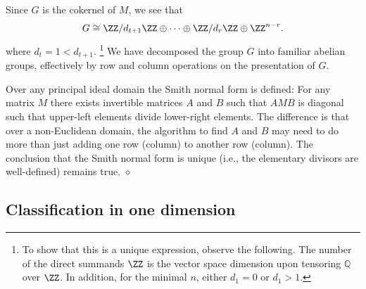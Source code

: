 Since $G$ is the cokernel of $M$,
we see that
\begin{align}
 G \cong \ZZ/d_{t+1} \ZZ \oplus \cdots \oplus \ZZ / d_r\ZZ \oplus \ZZ^{n-r} .
\end{align}
where $d_t = 1 < d_{t+1}$.%
\footnote{
To show that this is a unique expression,
observe the following.
The number of the direct summands $\ZZ$ is the vector space dimension
upon tensoring $\mathbb Q$ over $\ZZ$.
In addition, for the minimal $n$, either $d_1 = 0$ or $d_1 > 1$.
}
We have decomposed the group $G$ into familiar abelian groups,
effectively by row and column operations on the presentation of $G$.

\begin{rem}
Over any principal ideal domain the Smith normal form
is defined: For any matrix $M$ there exists invertible matrices $A$ and $B$
such that $A M B$ is diagonal such that upper-left elements divide
lower-right elements.
The difference is that over a non-Euclidean domain,
the algorithm to find $A$ and $B$ 
may need to do more than just adding one row (column) to another row (column).
The conclusion that the Smith normal form is unique (i.e., the elementary divisors are well-defined)
remains true.
\hfill $\diamond$ \end{rem}



\subsection{Classification in one dimension}

